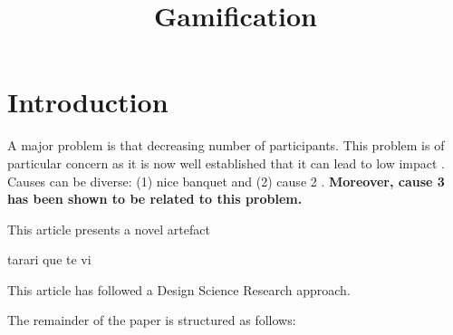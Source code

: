 \documentclass{article}
\title{Gamification}
\author{}
\newcommand{\todo}[1] {\iffalse #1 \fi} %
\begin{document}
\maketitle
      

\section{Introduction}


    
A major problem is that decreasing number of participants. This problem is of particular concern as it is now well established that it can lead to low impact \cite{Hamari2014} \cite{Hamari2014} \cite{Hamari2014} \cite{Hamari2014}. Causes can be diverse: (1) nice banquet \cite{Hamari2014} and (2) cause 2 \cite{Liu2017}.\textbf{ Moreover, cause 3 has been shown to be related to this problem. } 
    

    

    
This article presents a novel artefact
    
tarari que te vi \todo{poner bibliografia}

    

      
This article has followed a Design Science Research approach.

The remainder of the paper is structured as follows: 

    
      


\end{document}
